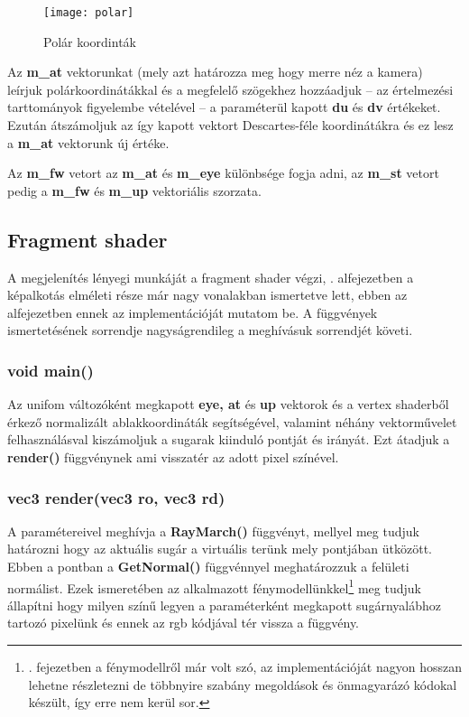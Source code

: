 \begin{figure}[H]
	\centering
	\texttt{[image: polar]}
	\caption{Polár koordinták \cite{Spherica72:online}}
	\label{fig:polar}
\end{figure}

Az \textbf{m\_at} vektorunkat (mely azt határozza meg hogy merre néz a kamera) leírjuk polárkoordinátákkal és a megfelelő szögekhez hozzáadjuk -- az értelmezési tarttományok figyelembe vételével -- a paraméterül kapott \textbf{du} és \textbf{dv} értékeket. Ezután átszámoljuk az így kapott vektort Descartes-féle koordinátákra és ez lesz a \textbf{m\_at} vektorunk új értéke.

Az \textbf{m\_fw} vetort az \textbf{m\_at} és \textbf{m\_eye} különbsége fogja adni, az \textbf{m\_st} vetort pedig a \textbf{m\_fw} és \textbf{m\_up} vektoriális szorzata.

\subsection{Fragment shader}
A megjelenítés lényegi munkáját a fragment shader végzi, . alfejezetben a képalkotás elméleti része már nagy vonalakban ismertetve lett, ebben az alfejezetben ennek az implementációját mutatom be. A függvények ismertetésének sorrendje nagyságrendileg a meghívásuk sorrendjét követi.

\subsubsection{void main()}
Az unifom változóként megkapott \textbf{eye, at} és \textbf{up} vektorok és a vertex shaderből érkező normalizált ablakkoordináták segítségével, valamint néhány vektorművelet felhasználásval kiszámoljuk a sugarak kiinduló pontját és irányát. Ezt átadjuk a \textbf{render()} függvénynek ami visszatér az adott pixel színével.

\subsubsection{vec3 render(vec3 ro, vec3 rd)}
A paramétereivel meghívja a \textbf{RayMarch()} függvényt, mellyel meg tudjuk határozni hogy az aktuális sugár a virtuális terünk mely pontjában ütközött. Ebben a pontban a \textbf{GetNormal()} függvénnyel meghatározzuk a felületi normálist. Ezek ismeretében az alkalmazott fénymodellünkkel\footnote{. fejezetben a fénymodellről már volt szó, az implementációját nagyon hosszan lehetne részletezni de többnyire szabány megoldások és önmagyarázó kódokal készült, így erre nem kerül sor.} meg tudjuk állapítni hogy milyen színű legyen a paraméterként megkapott sugárnyalábhoz tartozó pixelünk és ennek az rgb kódjával tér vissza a függvény. 

